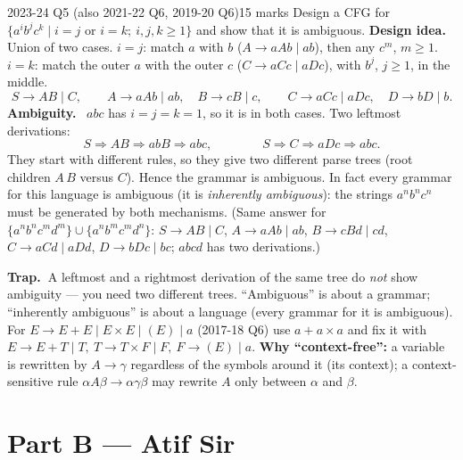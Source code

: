 \documentclass[10.5pt,a4paper]{article}
\newcommand{\TRAP}{\textbf{\color{trapborder}Trap.\ }}
\newcommand{\ansh}[1]{\textbf{\color{exborder}#1}\ }
\begin{document}
\begin{examq}{2023-24 Q5 (also 2021-22 Q6, 2019-20 Q6)}{15 marks}
Design a CFG for $\{a^ib^jc^k\mid i=j\text{ or }i=k;\ i,j,k\ge1\}$ and show that it is ambiguous.
\tcblower
\ansh{Design idea.} Union of two cases. $i=j$: match $a$ with $b$ ($A\to aAb\mid ab$), then any $c^m$, $m\ge1$. $i=k$: match the outer $a$ with
the outer $c$ ($C\to aCc\mid aDc$), with $b^j$, $j\ge1$, in the middle.
\[S\to AB\mid C,\qquad A\to aAb\mid ab,\quad B\to cB\mid c,\qquad C\to aCc\mid aDc,\quad D\to bD\mid b.\]
\ansh{Ambiguity.} $abc$ has $i=j=k=1$, so it is in both cases. Two leftmost derivations:
\[S\Rightarrow AB\Rightarrow abB\Rightarrow abc,\qquad\qquad S\Rightarrow C\Rightarrow aDc\Rightarrow abc.\]
They start with different rules, so they give two different parse trees (root children $A\,B$ versus $C$). Hence the grammar is ambiguous.
In fact every grammar for this language is ambiguous (it is \emph{inherently ambiguous}): the strings $a^nb^nc^n$ must be generated by both
mechanisms. (Same answer for $\{a^nb^nc^md^m\}\cup\{a^nb^mc^md^n\}$: $S\to AB\mid C$, $A\to aAb\mid ab$, $B\to cBd\mid cd$, $C\to aCd\mid aDd$,
$D\to bDc\mid bc$; $abcd$ has two derivations.)
\end{examq}

\begin{trap}\TRAP A leftmost and a rightmost derivation of the same tree do \emph{not} show ambiguity --- you need two different trees.
``Ambiguous'' is about a grammar; ``inherently ambiguous'' is about a language (every grammar for it is ambiguous). For
$E\to E+E\mid E\times E\mid(E)\mid a$ (2017-18 Q6) use $a+a\times a$ and fix it with $E\to E+T\mid T,\ T\to T\times F\mid F,\ F\to(E)\mid a$.
\textbf{Why ``context-free'':} a variable is rewritten by $A\to\gamma$ regardless of the symbols around it (its context); a context-sensitive
rule $\alpha A\beta\to\alpha\gamma\beta$ may rewrite $A$ only between $\alpha$ and $\beta$.\end{trap}

\clearpage
\section*{Part B --- Atif Sir}

\end{document}
